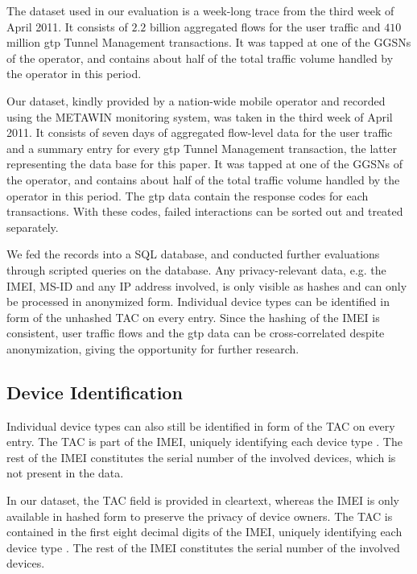 The dataset used in our evaluation is a week-long trace from the third week of April 2011. It consists of $2.2$ billion aggregated flows for the user traffic and $410$ million \gls{gtp} Tunnel Management transactions. It was tapped at one of the \glspl{GGSN} of the operator, and contains about half of the total traffic volume handled by the operator in this period.

Our dataset, kindly provided by a nation-wide mobile operator and recorded using the \gls{METAWIN} monitoring system, was taken in the third week of April 2011. It consists of seven days of aggregated flow-level data for the user traffic and a summary entry for every \gls{gtp} Tunnel Management transaction, the latter representing the data base for this paper. It was tapped at one of the \glspl{GGSN} of the operator, and contains about half of the total traffic volume handled by the operator in this period. The \gls{gtp} data contain the response codes for each transactions. With these codes, failed interactions can be sorted out and treated separately.

We fed the records into a SQL database, and conducted further evaluations through scripted queries on the database. Any privacy-relevant data, e.g. the \gls{IMEI}, \gls{MS-ID} and any IP address involved, is only visible as hashes and can only be processed in anonymized form. Individual device types can be identified in form of the unhashed \gls{TAC} on every entry. Since the hashing of the \gls{IMEI} is consistent, user traffic flows and the \gls{gtp} data can be cross-correlated despite anonymization, giving the opportunity for further research.

\subsection{Device Identification}

Individual device types can also still be identified in form of the \gls{TAC} on every entry. The \gls{TAC} is part of the \gls{IMEI}, uniquely identifying each device type \cite{3gpp.23.003}. The rest of the \gls{IMEI} constitutes the serial number of the involved devices, which is not present in the data.

In our dataset, the \gls{TAC} field is provided in clear\-text, whereas the \gls{IMEI} is only available in hashed form to preserve the privacy of device owners. The \gls{TAC} is contained in the first eight decimal digits of the \gls{IMEI}, uniquely identifying each device type \cite{3gpp.23.003}. The rest of the \gls{IMEI} constitutes the serial number of the involved devices.

